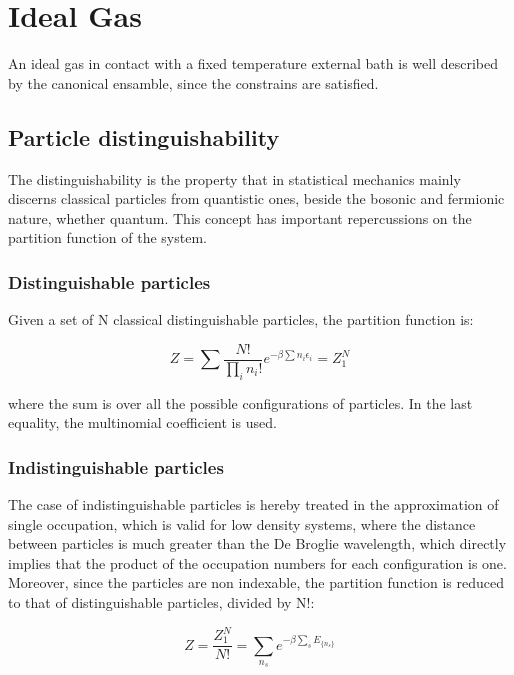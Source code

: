 \documentclass{article}
\begin{document}
\newpage

\section{Ideal Gas}

An ideal gas in contact with a fixed temperature external bath is well described by the canonical ensamble,
since the constrains are satisfied.

\subsection{Particle distinguishability}

The distinguishability is the property that in statistical mechanics mainly discerns classical particles from quantistic ones,
beside the bosonic and fermionic nature, whether quantum.
This concept has important repercussions on the partition function of the system.


\subsubsection{Distinguishable particles}

Given a set of N classical distinguishable particles, the partition function is:

\begin{equation}
    Z= \sum \frac{N!}{\prod_in_i!}e^{-\beta\sum n_i\epsilon_i}=Z_1^N
\end{equation}

where the sum is over all the possible configurations of particles. In the last equality, the multinomial coefficient is used.

\subsubsection{Indistinguishable particles}

The case of indistinguishable particles is hereby treated in the approximation of single occupation, which is valid for low density systems, where the distance between particles is much greater than the De Broglie wavelength,
which directly implies that the product of the occupation numbers for each configuration is one.
Moreover, since the particles are non indexable, the partition function is reduced to that of distinguishable particles, divided by N!:

\begin{equation}
    Z=\frac{Z_1^N}{N!}=\sum_{{n_s}}e^{-\beta\sum_{s}E_{\{n_s\}}}
\end{equation}
\end{document}
